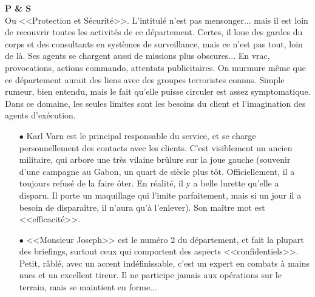 \documentclass[11pt,twoside,a4paper]{article}
\begin{document}
\begin{multicols}{2}
\textbf{\large P \& S}~\\
Ou <<Protection et S{\'e}curit{\'e}>>. L'intitul{\'e} n'est pas mensonger... mais il est loin de recouvrir toutes les activit{\'e}s de ce d{\'e}partement. Certes, il loue des gardes du corps et des consultants en syst{\`e}mes de surveillance, mais ce n'est pas tout, loin de l{\`a}. Ses agents se chargent aussi de missions plus obscures... En vrac, provocations, actions commando, attentats publicitaires. On murmure m{\^e}me que ce d{\'e}partement aurait des liens avec des groupes terroristes connus. Simple rumeur, bien entendu, mais le fait qu'elle puisse circuler est assez symptomatique. Dans ce domaine, les seules limites sont les besoins du client et l'imagination des agents d'ex{\'e}cution. 
\begin{itemize}
	\item[$\bullet$] Karl Varn est le principal responsable du service, et se charge personnellement des contacts avec les clients. C'est visiblement un ancien militaire, qui arbore une tr{\`e}s vilaine br{\^u}lure sur la joue gauche (souvenir d'une campagne au Gabon, un quart de si{\`e}cle plus t{\^o}t. Officiellement, il a toujours refus{\'e} de la faire {\^o}ter. En r{\'e}alit{\'e}, il y a belle lurette qu'elle a disparu. Il porte un maquillage qui l'imite parfaitement, mais si un jour il a besoin de dispara{\^i}tre, il n'aura qu'{\`a} l'enlever). Son ma{\^i}tre mot est <<efficacit{\'e}>>. 
	\item[$\bullet$] <<Monsieur Joseph>> est le num{\'e}ro 2 du d{\'e}partement, et fait la plupart des briefings, surtout ceux qui comportent des aspects <<confidentiels>>. Petit, r{\^a}bl{\'e}, avec un accent ind{\'e}finissable, c'est un expert en combats {\`a} mains nues et un excellent tireur. Il ne participe jamais aux op{\'e}rations sur le terrain, mais se maintient en forme...
\end{itemize} %

\vfill
\columnbreak


\end{multicols}
\end{document}
